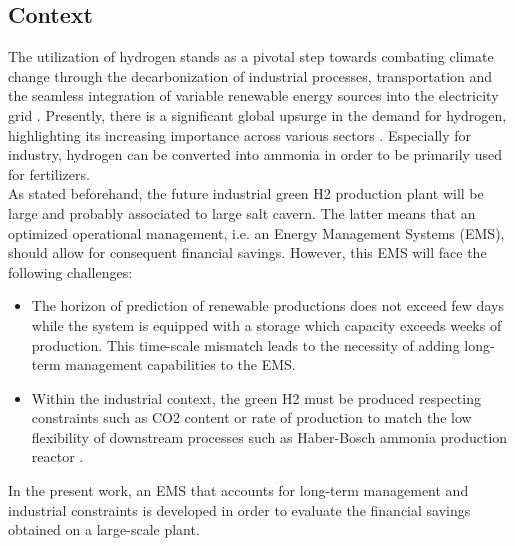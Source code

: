 \subsection{Context}

The utilization of hydrogen stands as a pivotal step towards combating climate change through the decarbonization of industrial processes, transportation and the seamless integration of variable renewable energy sources into the electricity grid \citep{shukla2022climate}.
Presently, there is a significant global upsurge in the demand for hydrogen, highlighting its increasing importance across various sectors \citep{iea_global_2022}. Especially for industry, hydrogen can be converted into ammonia in order to be primarily used for fertilizers. 
\\

As stated beforehand, the future industrial green H2 production plant will be large and probably associated to large salt cavern. The latter means that an optimized operational management, i.e. an Energy Management Systems (EMS), should allow for consequent financial savings. However, this EMS will face the following challenges: 
\begin{itemize}
    \item The horizon of prediction of renewable productions does not exceed few days while the system is equipped with a storage which capacity exceeds weeks of production. This time-scale mismatch leads to the necessity of adding long-term management capabilities to the EMS.
    \item Within the industrial context, the green H2 must be produced respecting constraints such as CO2 content \citep{green_hydrogen_organisation_green_2023} or rate of production to match the low flexibility of downstream processes such as Haber-Bosch ammonia production reactor \citep{shamiri_modeling_2021}.
\end{itemize}
In the present work, an EMS that accounts for long-term management and industrial constraints is developed in order to evaluate the financial savings obtained on a large-scale plant.
